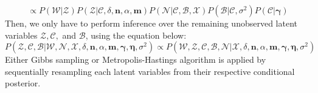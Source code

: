 \documentclass[a4paper]{article}
\begin{document}
\begin{equation}
\propto P(\mathcal{W}|\mathcal{Z})P( \mathcal{Z}|\mathcal{C}, \delta, \boldsymbol{n}, \alpha, \boldsymbol{m})P(\mathcal{N}|\mathcal{C}, \mathcal{B}, \mathcal{X})P(\mathcal{B}|\mathcal{C}, \sigma^2)P(\mathcal{C}|\boldsymbol{\gamma})
\end{equation}
Then, we only have to perform inference over the remaining unobserved latent variables $\mathcal{Z}, \mathcal{C},$ and $\mathcal{B}$, using the equation below:
\begin{equation}
P( \mathcal{Z}, \mathcal{C}, \mathcal{B}|\mathcal{W}, \mathcal{N}, \mathcal{X}, \delta, \boldsymbol{n}, \alpha, \boldsymbol{m}, \boldsymbol{\gamma}, \boldsymbol{\eta}, \sigma^2) \propto P(\mathcal{W},  \mathcal{Z}, \mathcal{C}, \mathcal{B}, \mathcal{N} | \mathcal{X}, \delta, \boldsymbol{n}, \alpha, \boldsymbol{m}, \boldsymbol{\gamma}, \boldsymbol{\eta}, \sigma^2)
\end{equation}
 Either Gibbs sampling or Metropolis-Hastings algorithm is applied by sequentially resampling each latent variables from their respective conditional posterior.
\end{document}

